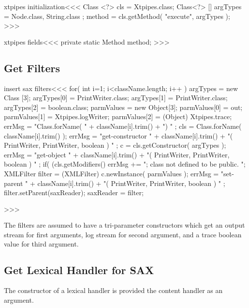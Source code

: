 \documentclass{article}
\begin{document}
{\<xtpipes initialization\><<<
Class <?> cls = Xtpipes.class;
Class<?> [] argTypes = { Node.class, String.class }; 
method = cls.getMethod( "execute", argTypes ); 
>>>

\<xtpipes fields\><<<
private static Method method;
>>>

\subsection{Get Filters}



\<insert sax filters\><<<
for( int i=1; i<className.length; i++ ){
   argTypes = new Class [3];
   argTypes[0] = PrintWriter.class; 
   argTypes[1] = PrintWriter.class;  
   argTypes[2] = boolean.class; 
   parmValues = new Object[3]; 
   parmValues[0] = out; 
   parmValues[1] = Xtpipes.logWriter; 
   parmValues[2] = (Object) Xtpipes.trace; 
   errMsg = "Class.forName( " + className[i].trim() + ") " ;
   cls = Class.forName( className[i].trim() );
   errMsg = "get-constructor "  
            + className[i].trim()
            + "( PrintWriter, PrintWriter, boolean ) " ;
   c = cls.getConstructor( argTypes ); 
   errMsg = "get-object " 
            + className[i].trim() 
            + "( PrintWriter, PrintWriter, boolean ) " ;
   if( (cls.getModifiers() %
      errMsg += "; class not defined to be public. ";
   }
   XMLFilter filter = (XMLFilter) c.newInstance( parmValues );   
   errMsg = "set-parent " 
            +  className[i].trim() 
            + "( PrintWriter, PrintWriter, boolean ) " ;
   filter.setParent(saxReader);
   saxReader = filter;
}
>>>


The filters are assumed to have a tri-parameter constructors which
get an output stream for first arguments, log stream for second argument, and 
a trace boolean value for third argument.



\subsection{Get Lexical Handler for SAX}









The constructor of a lexical handler is provided the 
content handler as an argument.
\end{document}
